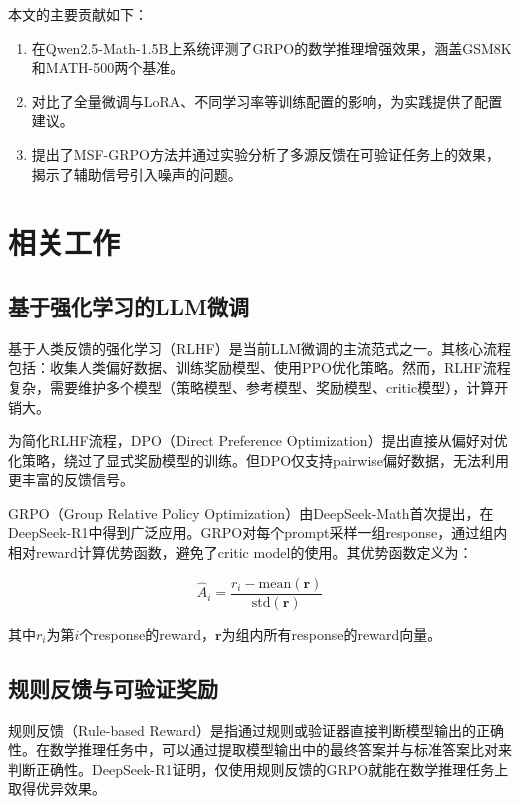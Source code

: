\documentclass[10.5pt]{article}
\begin{document}
本文的主要贡献如下：

\begin{enumerate}[leftmargin=2em]
  \item 在Qwen2.5-Math-1.5B上系统评测了GRPO的数学推理增强效果，涵盖GSM8K和MATH-500两个基准。
  \item 对比了全量微调与LoRA、不同学习率等训练配置的影响，为实践提供了配置建议。
  \item 提出了MSF-GRPO方法并通过实验分析了多源反馈在可验证任务上的效果，揭示了辅助信号引入噪声的问题。
\end{enumerate}

\section{相关工作}

\subsection{基于强化学习的LLM微调}

基于人类反馈的强化学习（RLHF）\cite{instructgpt}是当前LLM微调的主流范式之一。其核心流程包括：收集人类偏好数据、训练奖励模型、使用PPO\cite{ppo}优化策略。然而，RLHF流程复杂，需要维护多个模型（策略模型、参考模型、奖励模型、critic模型），计算开销大。

为简化RLHF流程，DPO（Direct Preference Optimization）\cite{dpo}提出直接从偏好对优化策略，绕过了显式奖励模型的训练。但DPO仅支持pairwise偏好数据，无法利用更丰富的反馈信号。

GRPO（Group Relative Policy Optimization）\cite{deepseekmath}由DeepSeek-Math首次提出，在DeepSeek-R1\cite{deepseekr1}中得到广泛应用。GRPO对每个prompt采样一组response，通过组内相对reward计算优势函数，避免了critic model的使用。其优势函数定义为：

\begin{equation}
\hat{A}_i = \frac{r_i - \text{mean}(\mathbf{r})}{\text{std}(\mathbf{r})}
\end{equation}

其中$r_i$为第$i$个response的reward，$\mathbf{r}$为组内所有response的reward向量。

\subsection{规则反馈与可验证奖励}

规则反馈（Rule-based Reward）是指通过规则或验证器直接判断模型输出的正确性。在数学推理任务中，可以通过提取模型输出中的最终答案并与标准答案比对来判断正确性。DeepSeek-R1\cite{deepseekr1}证明，仅使用规则反馈的GRPO就能在数学推理任务上取得优异效果。
\end{document}
